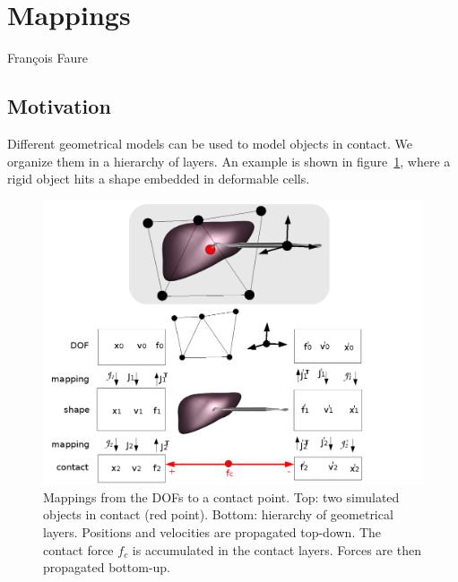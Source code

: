  \section{Mappings} \label{sec:mappings}
Fran\c{c}ois Faure


\newcommand{\mass}{\ensuremath{M}}             %
\newcommand{\vol}{\ensuremath{\mathcal V}} %
\newcommand{\press}{\ensuremath{\rho}}


\subsection{Motivation} \label{sec:geometryLayers}
Different geometrical models can be used to model objects in contact.
We organize them in a hierarchy of layers. An example is shown in figure~\ref{fig:hierarchy}, where a rigid object hits a shape embedded in deformable cells.

\begin{figure}
 \centering
 \includegraphics[width=\linewidth]{mappings.png}
 \caption{Mappings from the DOFs to a contact point. Top: two simulated objects in contact (red point). Bottom: hierarchy of geometrical layers. Positions and velocities are propagated top-down. The contact force $f_c$ is accumulated in the contact layers. Forces are then propagated bottom-up.
}
 \label{fig:hierarchy}
\end{figure}

